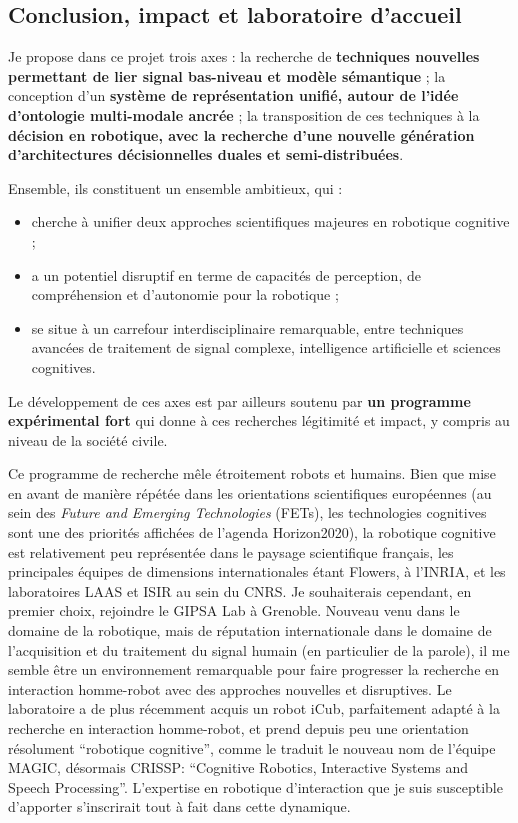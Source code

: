 \documentclass[a4paper]{article}
\begin{document}
\subsection*{Conclusion, impact et laboratoire d'accueil}

Je propose dans ce projet trois axes : la recherche de
\textbf{techniques nouvelles permettant de lier signal bas-niveau et modèle
sémantique} ; la conception d'un \textbf{système de représentation unifié,
autour de l'idée d'ontologie multi-modale ancrée} ; la transposition de ces
techniques à la \textbf{décision en robotique, avec la recherche d'une nouvelle
génération d'architectures décisionnelles duales et semi-distribuées}.

Ensemble, ils constituent un ensemble ambitieux, qui :
\begin{itemize}
    \item cherche à unifier deux approches scientifiques majeures en robotique
        cognitive ;
    \item a un potentiel disruptif en terme de capacités de perception, de
        compréhension et d'autonomie pour la robotique ;
    \item se situe à un carrefour interdisciplinaire remarquable, entre
        techniques avancées de traitement de signal complexe, intelligence
        artificielle et sciences cognitives.
\end{itemize}

Le développement de ces axes est par ailleurs soutenu par \textbf{un programme
expérimental fort} qui donne à ces recherches légitimité et impact, y compris au
niveau de la société civile.

Ce programme de recherche mêle étroitement robots et humains. Bien que mise en
avant de manière répétée dans les orientations scientifiques européennes (au
sein des \emph{Future and Emerging Technologies} (FETs), les technologies
cognitives sont une des priorités affichées de l'agenda Horizon2020), la
robotique cognitive est relativement peu représentée dans le paysage
scientifique français, les principales équipes de dimensions internationales
étant Flowers, à l'INRIA, et les laboratoires LAAS et ISIR au sein du CNRS. Je
souhaiterais cependant, en premier choix, rejoindre le GIPSA Lab à Grenoble.
Nouveau venu dans le domaine de la robotique, mais de réputation internationale
dans le domaine de l'acquisition et du traitement du signal humain (en
particulier de la parole), il me semble être un environnement remarquable pour
faire progresser la recherche en interaction homme-robot avec des approches
nouvelles et disruptives. Le laboratoire a de plus récemment acquis un robot
iCub, parfaitement adapté à la recherche en interaction homme-robot, et prend
depuis peu une orientation résolument ``robotique cognitive'', comme le traduit
le nouveau nom de l'équipe MAGIC, désormais CRISSP: ``Cognitive Robotics,
Interactive Systems and Speech Processing''.  L'expertise en robotique
d'interaction que je suis susceptible d'apporter s'inscrirait tout à fait dans
cette dynamique.
\end{document}
